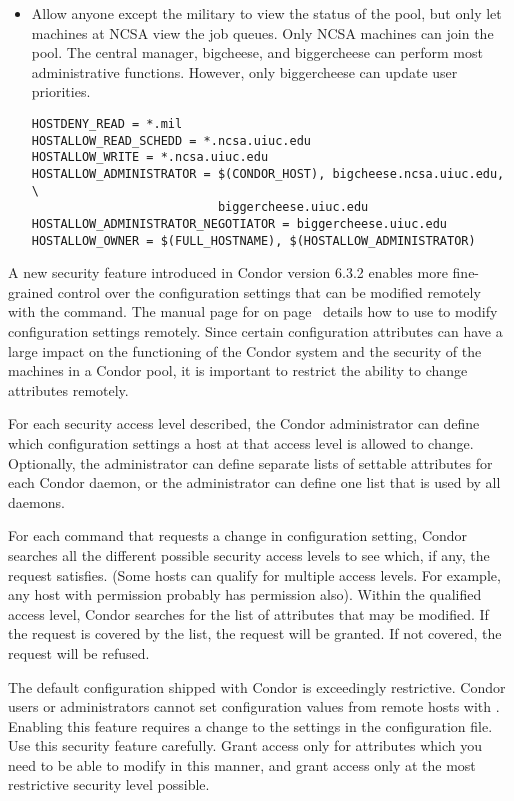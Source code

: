 \begin{itemize}
\item Allow anyone except the military to view the status of the
pool, but only let machines at NCSA view the job queues.
Only NCSA machines can join the pool.
The central manager, bigcheese, and
biggercheese can perform most administrative functions.
However, only biggercheese can update user priorities.
\begin{verbatim}
HOSTDENY_READ = *.mil
HOSTALLOW_READ_SCHEDD = *.ncsa.uiuc.edu 
HOSTALLOW_WRITE = *.ncsa.uiuc.edu
HOSTALLOW_ADMINISTRATOR = $(CONDOR_HOST), bigcheese.ncsa.uiuc.edu, \
                          biggercheese.uiuc.edu
HOSTALLOW_ADMINISTRATOR_NEGOTIATOR = biggercheese.uiuc.edu
HOSTALLOW_OWNER = $(FULL_HOSTNAME), $(HOSTALLOW_ADMINISTRATOR)
\end{verbatim}

\end{itemize}

A new security feature introduced in
Condor version 6.3.2 enables more fine-grained control over the
configuration settings that can be modified remotely with the
 command.
The manual page for  on
page~\pageref{man-condor-config-val} details how to use 
\Condor{config\_val} to modify configuration settings remotely. 
Since certain configuration attributes can have a large impact on the 
functioning of the Condor system and the security of the machines in a
Condor pool, it is important to restrict the ability to change
attributes remotely.

For each security access level described,
the Condor
administrator can define which configuration settings a host at that
access level is allowed to change.
Optionally, the administrator can define separate lists of settable
attributes for each Condor daemon, or the administrator
can define one list that is used by all daemons.

For each command that requests a change in configuration setting,
Condor searches all the different possible security access
levels to see which, if any, the request satisfies.
(Some hosts can qualify for multiple access levels. For example, any
host with \DCPerm{ADMINISTRATOR} permission probably has
 permission also).
Within the qualified access level,
Condor searches for the list of attributes that may be modified.
If the request is covered by the list,
the request will be granted.
If not covered, the request will be refused.

The default configuration shipped with Condor is exceedingly
restrictive.
Condor users or administrators cannot set
configuration values from remote hosts with .
Enabling this feature requires a change to the
settings in the configuration file.
Use this security feature carefully.
Grant access only for attributes which you need to be able to modify
in this manner, and grant access only at the most restrictive
security level possible.


